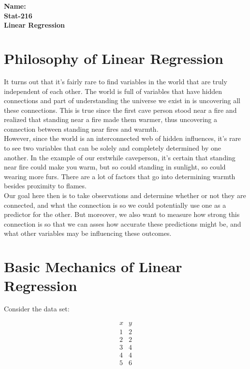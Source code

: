 \documentclass[10pt]{article}
\theoremstyle{definition}
\begin{document}
%

{\bf Name:} \hrulefill\hrulefill\hrulefill\\
{\bf Stat-216} \qquad \qquad \\
{\bf Linear Regression }\\ %



\section{Philosophy of Linear Regression}

It turns out that it's fairly rare to find variables in the world that are truly independent of each other.  The world is full of variables that have hidden connections and part of understanding the universe we exist in is uncovering all these connections.  This is true since the first cave person stood near a fire and realized that standing near a fire made them warmer, thus uncovering a connection between standing near fires and warmth.\\

However, since the world is an interconnected web of hidden influences, it's rare to see two variables that can be solely and completely determined by one another.  In the example of our erstwhile caveperson, it's certain that standing near fire could make you warm, but so could standing in sunlight, so could wearing more furs.  There are a lot of factors that go into determining warmth besides proximity to flames.\\

Our goal here then is to take observations and determine whether or not they are connected, and what the connection is so we could potentially use one as a predictor for the other.  But moreover, we also want to measure how strong this connection is so that we can asses how accurate these predictions might be, and what other variables may be influencing these outcomes.


\section{Basic Mechanics of Linear Regression}

Consider the data set:

$$\begin{array}{c|c}
x&y\\
\hline
1&2\\
2&2\\
3&4\\
4&4\\
5&6
\end{array}$$
\end{document}
